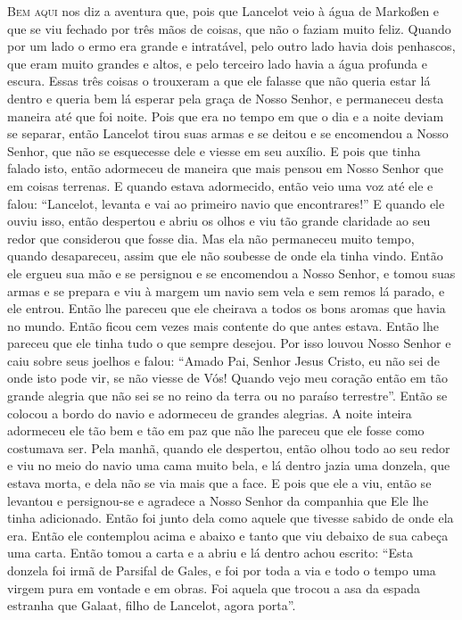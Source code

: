 \textsc{Bem aqui} nos diz a aventura que, pois que Lancelot veio à água de Markoßen
e que se viu fechado por três mãos de coisas, que não o faziam muito feliz. 
Quando por um lado o ermo era grande e intratável, pelo outro lado havia
dois penhascos, que eram muito grandes e altos, e pelo terceiro lado havia a
água profunda e escura. Essas três coisas o trouxeram a que ele falasse que não
queria estar lá dentro e queria bem lá esperar pela graça de Nosso Senhor, e
permaneceu desta maneira até que foi noite. Pois que era no tempo em que o dia
e a noite deviam se separar, então Lancelot tirou suas armas e se deitou e se
encomendou a Nosso Senhor, que não se esquecesse dele e viesse em seu auxílio.
E pois que tinha falado isto, então adormeceu de maneira que mais pensou em
Nosso Senhor que em coisas terrenas. E quando estava adormecido, então veio uma
voz até ele e falou: “Lancelot, levanta e vai ao primeiro navio que
encontrares!” E quando ele ouviu isso, então despertou e abriu os
olhos e viu tão grande claridade ao seu redor que considerou que fosse dia. Mas ela
não permaneceu muito tempo, quando desapareceu, assim que ele não soubesse de
onde ela tinha vindo. Então ele ergueu sua mão e se persignou e se encomendou
a Nosso Senhor, e tomou suas armas e se prepara e viu à margem um navio sem
vela e sem remos lá parado, e ele entrou. Então lhe pareceu que ele cheirava a
todos os bons aromas que havia no mundo. Então ficou cem vezes mais contente do
que antes estava. Então lhe pareceu que ele tinha tudo o que sempre desejou.
Por isso louvou Nosso Senhor e caiu sobre seus joelhos e falou: “Amado Pai,
Senhor Jesus Cristo, eu não sei de onde isto pode vir, se não viesse de Vós!
Quando vejo meu coração então em tão grande alegria que não sei se no reino da
terra ou no paraíso terrestre”. Então se colocou a bordo do navio e adormeceu
de grandes alegrias. A noite inteira adormeceu ele tão bem e tão em paz que não
lhe pareceu que ele fosse como costumava ser. Pela manhã, quando ele despertou,
então olhou todo ao seu redor e viu no meio do navio uma cama muito bela, e lá
dentro jazia uma donzela, que estava morta, e dela não se via mais que a face.
E pois que ele a viu, então se levantou e persignou-se e agradece a Nosso
Senhor da companhia que Ele lhe tinha adicionado. Então foi junto dela como
aquele que tivesse sabido de onde ela era. Então ele contemplou acima e abaixo
e tanto que viu debaixo de sua cabeça uma carta. Então tomou a carta e a abriu
e lá dentro achou escrito: “Esta donzela foi irmã de Parsifal de Gales, e foi
por toda a via e todo o tempo uma virgem pura em vontade e em obras. Foi aquela
que trocou a asa da espada estranha que Galaat, filho de Lancelot, agora
porta”.

